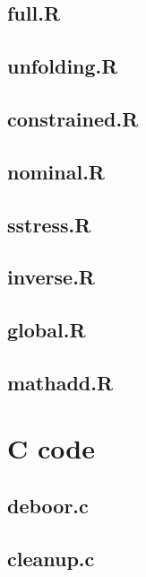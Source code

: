 \documentclass[
  12pt,
]{book}
\begin{document}
\subsection{full.R}\label{apcodefull}

\subsection{unfolding.R}\label{apcodeunfold}

\subsection{constrained.R}\label{apcodencons}

\subsection{nominal.R}\label{apcodenominal}

\subsection{sstress.R}\label{apcodesstress}

\subsection{inverse.R}\label{apcodeinverse}

\subsection{global.R}\label{apcodeglobal}

\subsection{mathadd.R}\label{apcodemathadd}

\section{C code}\label{c-code}

\subsection{deboor.c}\label{deboor.c}

\subsection{cleanup.c}\label{cleanup.c}
\end{document}
